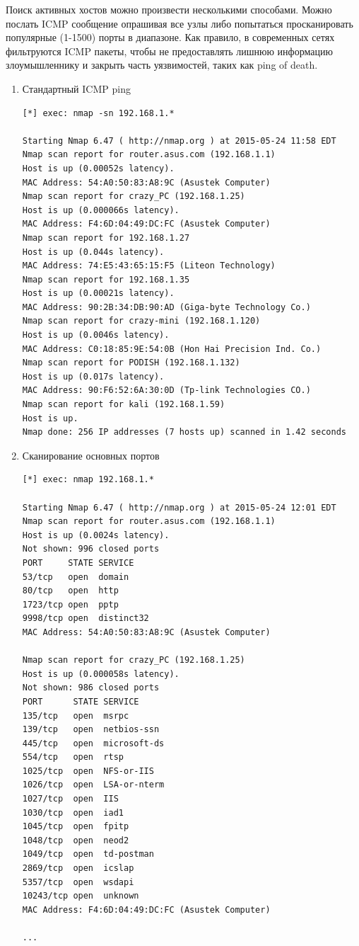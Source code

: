 \documentclass{article}
\begin{document}
Поиск активных хостов можно произвести несколькими способами. Можно послать ICMP сообщение опрашивая все узлы либо попытаться просканировать популярные (1-1500) порты в диапазоне. Как правило, в современных сетях фильтруются ICMP пакеты, чтобы не предоставлять лишнюю информацию злоумышленнику и закрыть часть уязвимостей, таких как ping of death.

\begin{enumerate}
\item Стандартный ICMP ping

\begin{verbatim}
[*] exec: nmap -sn 192.168.1.*

Starting Nmap 6.47 ( http://nmap.org ) at 2015-05-24 11:58 EDT
Nmap scan report for router.asus.com (192.168.1.1)
Host is up (0.00052s latency).
MAC Address: 54:A0:50:83:A8:9C (Asustek Computer)
Nmap scan report for crazy_PC (192.168.1.25)
Host is up (0.000066s latency).
MAC Address: F4:6D:04:49:DC:FC (Asustek Computer)
Nmap scan report for 192.168.1.27
Host is up (0.044s latency).
MAC Address: 74:E5:43:65:15:F5 (Liteon Technology)
Nmap scan report for 192.168.1.35
Host is up (0.00021s latency).
MAC Address: 90:2B:34:DB:90:AD (Giga-byte Technology Co.)
Nmap scan report for crazy-mini (192.168.1.120)
Host is up (0.0046s latency).
MAC Address: C0:18:85:9E:54:0B (Hon Hai Precision Ind. Co.)
Nmap scan report for PODISH (192.168.1.132)
Host is up (0.017s latency).
MAC Address: 90:F6:52:6A:30:0D (Tp-link Technologies CO.)
Nmap scan report for kali (192.168.1.59)
Host is up.
Nmap done: 256 IP addresses (7 hosts up) scanned in 1.42 seconds
\end{verbatim}

\item Сканирование основных портов
\begin{verbatim}
[*] exec: nmap 192.168.1.*

Starting Nmap 6.47 ( http://nmap.org ) at 2015-05-24 12:01 EDT
Nmap scan report for router.asus.com (192.168.1.1)
Host is up (0.0024s latency).
Not shown: 996 closed ports
PORT     STATE SERVICE
53/tcp   open  domain
80/tcp   open  http
1723/tcp open  pptp
9998/tcp open  distinct32
MAC Address: 54:A0:50:83:A8:9C (Asustek Computer)

Nmap scan report for crazy_PC (192.168.1.25)
Host is up (0.000058s latency).
Not shown: 986 closed ports
PORT      STATE SERVICE
135/tcp   open  msrpc
139/tcp   open  netbios-ssn
445/tcp   open  microsoft-ds
554/tcp   open  rtsp
1025/tcp  open  NFS-or-IIS
1026/tcp  open  LSA-or-nterm
1027/tcp  open  IIS
1030/tcp  open  iad1
1045/tcp  open  fpitp
1048/tcp  open  neod2
1049/tcp  open  td-postman
2869/tcp  open  icslap
5357/tcp  open  wsdapi
10243/tcp open  unknown
MAC Address: F4:6D:04:49:DC:FC (Asustek Computer)

...
\end{verbatim}
\end{enumerate}
\end{document}
